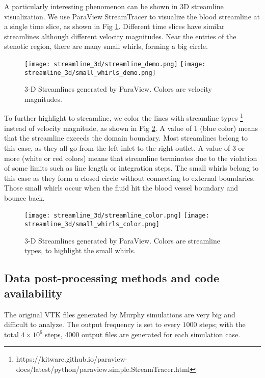 A particularly interesting phenomenon can be shown in 3D streamline visualization. We use ParaView StreamTracer to visualize the blood streamline at a single time slice, as shown in Fig \ref{fig:streamline_demo}. Different time slices have similar streamlines although different velocity magnitudes. Near the entries of the stenotic region, there are many small whirls, forming a big circle.

\begin{figure}[H]
\texttt{[image: streamline\_3d/streamline\_demo.png]}
\texttt{[image: streamline\_3d/small\_whirls\_demo.png]}
\caption{3-D Streamlines generated by ParaView. Colors are velocity magnitudes.}
\label{fig:streamline_demo}
\end{figure}

To further highlight to streamline, we color the lines with streamline types \footnote{https://kitware.github.io/paraview-docs/latest/python/paraview.simple.StreamTracer.html} instead of velocity magnitude, as shown in Fig \ref{fig:streamline_color}. A value of 1 (blue color) means that the streamline exceeds the domain boundary. Most streamlines belong to this case, as they all go from the left inlet to the right outlet. A value of 3 or more (white or red colors) means that streamline terminates due to the violation of some limits such as line length or integration steps. The small whirls belong to this case as they form a closed circle without connecting to external boundaries. Those small whirls occur when the fluid hit the blood vessel boundary and bounce back. 

\begin{figure}[H]
\texttt{[image: streamline\_3d/streamline\_color.png]}
\texttt{[image: streamline\_3d/small\_whirls\_color.png]}
\caption{3-D Streamlines generated by ParaView. Colors are streamline types, to highlight the small whirls.}
\label{fig:streamline_color}
\end{figure}

\subsection{Data post-processing methods and code availability}

The original VTK files generated by Murphy simulations are very big and difficult to analyze. The output frequency is set to every $1000$ steps; with the total $4 \times 10^6$ steps, 4000 output files are generated for each simulation case.

